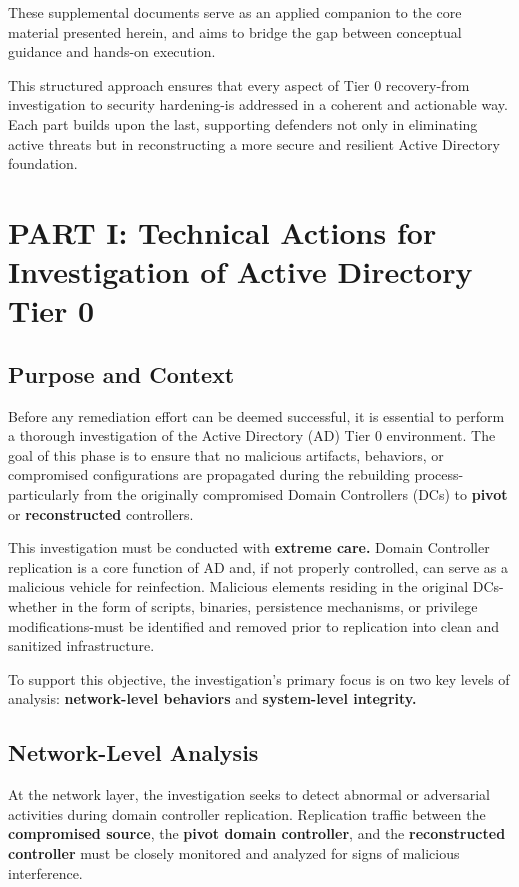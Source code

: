 These supplemental documents serve as an applied companion to the core material presented herein, and aims to bridge the gap between conceptual guidance and hands-on execution.

This structured approach ensures that every aspect of Tier 0 recovery-from investigation to security hardening-is addressed in a coherent and actionable way. Each part builds upon the last, supporting defenders not only in eliminating active threats but in reconstructing a more secure and resilient Active Directory foundation.

\section{PART I: Technical Actions for Investigation of Active Directory Tier 0}

\subsection{Purpose and Context}
Before any remediation effort can be deemed successful, it is essential to perform a thorough investigation of the Active Directory (AD) Tier 0 environment. The goal of this phase is to ensure that no malicious artifacts, behaviors, or compromised configurations are propagated during the rebuilding process-particularly from the originally compromised Domain Controllers (DCs) to \textbf{pivot} or \textbf{reconstructed} controllers.

This investigation must be conducted with \textbf{extreme care.} Domain Controller replication is a core function of AD and, if not properly controlled, can serve as a malicious vehicle for reinfection. Malicious elements residing in the original DCs-whether in the form of scripts, binaries, persistence mechanisms, or privilege modifications-must be identified and removed prior to replication into clean and sanitized infrastructure.

To support this objective, the investigation's primary focus is on two key levels of analysis: \textbf{network-level behaviors} and \textbf{system-level integrity.}

\subsection{Network-Level Analysis}
At the network layer, the investigation seeks to detect abnormal or adversarial activities during domain controller replication. Replication traffic between the \textbf{compromised source}, the \textbf{pivot domain controller}, and the \textbf{reconstructed controller} must be closely monitored and analyzed for signs of malicious interference.

